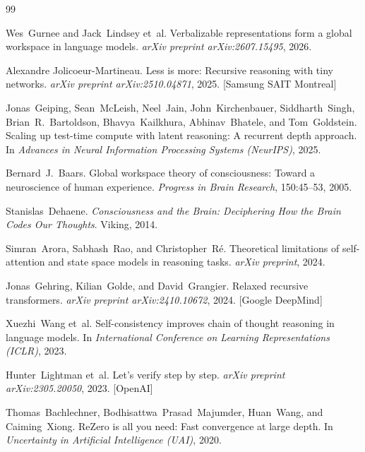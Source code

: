 \documentclass[11pt,a4paper]{article}
\begin{document}
\begin{thebibliography}{99}
\small

Wes~Gurnee and Jack~Lindsey et~al.
\newblock Verbalizable representations form a global workspace in language models.
\newblock \emph{arXiv preprint arXiv:2607.15495}, 2026.

Alexandre Jolicoeur-Martineau.
\newblock Less is more: Recursive reasoning with tiny networks.
\newblock \emph{arXiv preprint arXiv:2510.04871}, 2025. [Samsung SAIT Montreal]

Jonas~Geiping, Sean~McLeish, Neel~Jain, John~Kirchenbauer, Siddharth~Singh, Brian~R.~Bartoldson, Bhavya~Kailkhura, Abhinav~Bhatele, and Tom~Goldstein.
\newblock Scaling up test-time compute with latent reasoning: A recurrent depth approach.
\newblock In \emph{Advances in Neural Information Processing Systems (NeurIPS)}, 2025.

Bernard~J.~Baars.
\newblock Global workspace theory of consciousness: Toward a neuroscience of human experience.
\newblock \emph{Progress in Brain Research}, 150:45--53, 2005.

Stanislas~Dehaene.
\newblock \emph{Consciousness and the Brain: Deciphering How the Brain Codes Our Thoughts}.
\newblock Viking, 2014.

Simran~Arora, Sabhash~Rao, and Christopher~R\'e.
\newblock Theoretical limitations of self-attention and state space models in reasoning tasks.
\newblock \emph{arXiv preprint}, 2024.

Jonas~Gehring, Kilian~Golde, and David~Grangier.
\newblock Relaxed recursive transformers.
\newblock \emph{arXiv preprint arXiv:2410.10672}, 2024. [Google DeepMind]

Xuezhi~Wang et~al.
\newblock Self-consistency improves chain of thought reasoning in language models.
\newblock In \emph{International Conference on Learning Representations (ICLR)}, 2023.

Hunter~Lightman et~al.
\newblock Let's verify step by step.
\newblock \emph{arXiv preprint arXiv:2305.20050}, 2023. [OpenAI]

Thomas~Bachlechner, Bodhisattwa~Prasad~Majumder, Huan~Wang, and Caiming~Xiong.
\newblock ReZero is all you need: Fast convergence at large depth.
\newblock In \emph{Uncertainty in Artificial Intelligence (UAI)}, 2020.


\end{thebibliography}
\end{document}
